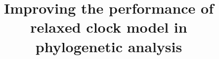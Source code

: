 \documentclass{bmcart}
\begin{document}
\begin{frontmatter}
\begin{fmbox}

\title{Improving the performance of relaxed clock model in phylogenetic analysis}

\author[
   addressref={aff1},                   %
   corref={aff1},                       %
   email={alexei@cs.auckland.ac.nz}   %
]{\inits{} }
\author[
   addressref={aff1},
   email={rzha419@aucklanduni.ac.nz}
]{\inits{} }

\address[id=aff1]{%
  , %
  ,                     %
  ,                              %
}



\end{fmbox}%


\end{frontmatter}
\end{document}
